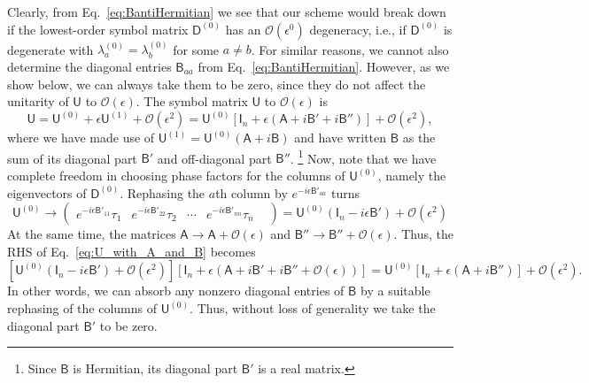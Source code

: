 Clearly, from Eq.~\eqref{eq:BantiHermitian} we see that our scheme would break down if the lowest-order symbol matrix $\mathsf{D}^{(0)}$ has an $\mathcal{O}(\epsilon^{0})$ degeneracy, i.e., if $\mathsf{D}^{(0)}$ is degenerate with $\lambda^{(0)}_{a} = \lambda^{(0)}_{b}$ for some $a \neq b$.
For similar reasons, we cannot also determine the diagonal entries $\mathsf{B}_{aa}$ from Eq.~\eqref{eq:BantiHermitian}.
However, as we show below, we can always take them to be zero, since they do not affect the unitarity of $\mathsf{U}$ to $\mathcal{O}(\epsilon)$.
The symbol matrix $\mathsf{U}$ to $\mathcal{O}(\epsilon)$ is
%
\begin{equation}
  \mathsf{U} = \mathsf{U}^{(0)} + \epsilon \mathsf{U}^{(1)} + \mathcal{O}(\epsilon^{2}) = \mathsf{U}^{(0)}\left[\mathsf{I}_{n} + \epsilon\left(\mathsf{A} + i\mathsf{B}' + i\mathsf{B}'' \right)\right] + \mathcal{O}(\epsilon^{2}),
  \label{eq:U_with_A_and_B}
\end{equation}
%
where we have made use of $\mathsf{U}^{(1)} = \mathsf{U}^{(0)}(\mathsf{A} + i\mathsf{B})$ and have written $\mathsf{B}$ as the sum of its diagonal part $\mathsf{B}'$ and off-diagonal part $\mathsf{B}''$.%
\footnote{Since $\mathsf{B}$ is Hermitian, its diagonal part $\mathsf{B}'$ is a real matrix.}
Now, note that we have complete freedom in choosing phase factors for the columns of $\mathsf{U}^{(0)}$, namely the eigenvectors of $\mathsf{D}^{(0)}$.
Rephasing the $a$th column by $e^{-i\epsilon\mathsf{B}'_{aa}}$ turns
%
\begin{equation}
    \mathsf{U}^{(0)} \to
      \begin{pmatrix}
        e^{-i\epsilon\mathsf{B}'_{11}}\tau_{1} &
        e^{-i\epsilon\mathsf{B}'_{22}}\tau_{2} &
        \cdots &
        e^{-i\epsilon\mathsf{B}'_{nn}}\tau_{n} &
      \end{pmatrix}
      = \mathsf{U}^{(0)}(\mathsf{I}_{n} - i\epsilon\mathsf{B}') + \mathcal{O}(\epsilon^{2})
\end{equation}
%
At the same time, the matrices $\mathsf{A} \to \mathsf{A} + \mathcal{O}(\epsilon)$ and $\mathsf{B}'' \to \mathsf{B}'' + \mathcal{O}(\epsilon)$.
Thus, the RHS of Eq.~\eqref{eq:U_with_A_and_B} becomes
%
\begin{equation}
  \left[\mathsf{U}^{(0)}(\mathsf{I}_{n} - i\epsilon\mathsf{B}') + \mathcal{O}(\epsilon^{2})\right]\left[\mathsf{I}_{n} + \epsilon\left(\mathsf{A} + i\mathsf{B}' + i\mathsf{B}'' + \mathcal{O}(\epsilon)\right)\right]
  =
  \mathsf{U}^{(0)}\left[\mathsf{I}_{n} + \epsilon\left(\mathsf{A} + i\mathsf{B}'' \right)\right] + \mathcal{O}(\epsilon^{2}).
\end{equation}
%
In other words, we can absorb any nonzero diagonal entries of $\mathsf{B}$ by a suitable rephasing of the columns of $\mathsf{U}^{(0)}$.
Thus, without loss of generality we take the diagonal part $\mathsf{B}'$ to be zero.

